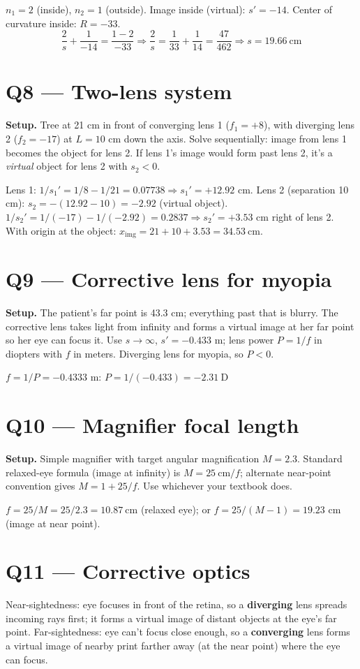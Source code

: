 \documentclass[11pt]{article}
\begin{document}
$n_1=2$ (inside), $n_2=1$ (outside). Image inside (virtual): $s' = -14$. Center of curvature inside: $R = -33$.
\[ \frac{2}{s} + \frac{1}{-14} = \frac{1-2}{-33} \Rightarrow \frac{2}{s} = \frac{1}{33}+\frac{1}{14} = \frac{47}{462} \Rightarrow s = \boxed{19.66\ \text{cm}} \]

\section*{Q8 --- Two-lens system}
\textbf{Setup.} Tree at 21 cm in front of converging lens 1 ($f_1=+8$), with diverging lens 2 ($f_2=-17$) at $L=10$ cm down the axis. Solve sequentially: image from lens 1 becomes the object for lens 2. If lens 1's image would form past lens 2, it's a \emph{virtual} object for lens 2 with $s_2<0$.

Lens 1: $1/s_1' = 1/8 - 1/21 = 0.07738 \Rightarrow s_1' = +12.92$ cm.
Lens 2 (separation 10 cm): $s_2 = -(12.92-10) = -2.92$ (virtual object).
$1/s_2' = 1/(-17) - 1/(-2.92) = 0.2837 \Rightarrow s_2' = +3.53$ cm right of lens 2.
With origin at the object: $x_{\text{img}} = 21 + 10 + 3.53 = \boxed{34.53\ \text{cm}}$.

\section*{Q9 --- Corrective lens for myopia}
\textbf{Setup.} The patient's far point is 43.3 cm; everything past that is blurry. The corrective lens takes light from infinity and forms a virtual image at her far point so her eye can focus it. Use $s\to\infty$, $s'=-0.433$ m; lens power $P=1/f$ in diopters with $f$ in meters. Diverging lens for myopia, so $P<0$.

$f = 1/P = -0.4333$ m: $P = 1/(-0.433) = \boxed{-2.31\ \text{D}}$

\section*{Q10 --- Magnifier focal length}
\textbf{Setup.} Simple magnifier with target angular magnification $M=2.3$. Standard relaxed-eye formula (image at infinity) is $M = 25\ \text{cm}/f$; alternate near-point convention gives $M=1+25/f$. Use whichever your textbook does.

$f = 25/M = 25/2.3 = \boxed{10.87\ \text{cm}}$ (relaxed eye); or $f = 25/(M-1) = 19.23$ cm (image at near point).

\section*{Q11 --- Corrective optics}
Near-sightedness: eye focuses in front of the retina, so a \textbf{diverging} lens spreads incoming rays first; it forms a virtual image of distant objects at the eye's far point. Far-sightedness: eye can't focus close enough, so a \textbf{converging} lens forms a virtual image of nearby print farther away (at the near point) where the eye can focus.
\end{document}
